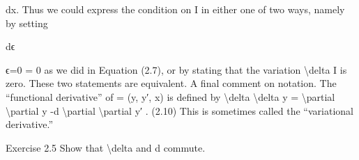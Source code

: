 \begin{exercise}
dx.
Thus we could express the condition on I in either one of two ways, namely
by setting

dϵ

ϵ=0
= 0
as we did in Equation (2.7), or by stating that the variation \textbackslash{}delta I is zero. These
two statements are equivalent.
A final comment on notation. The ``functional derivative'' of  = (y, y′, x)
is defined by
\textbackslash{}delta
\textbackslash{}delta y = \textbackslash{}partial
\textbackslash{}partial y -d
\textbackslash{}partial
\textbackslash{}partial y′ .
(2.10)
This is sometimes called the ``variational derivative.''
\end{exercise}

\begin{exercise}
Exercise 2.5 Show that \textbackslash{}delta  and d commute.
\end{exercise}


